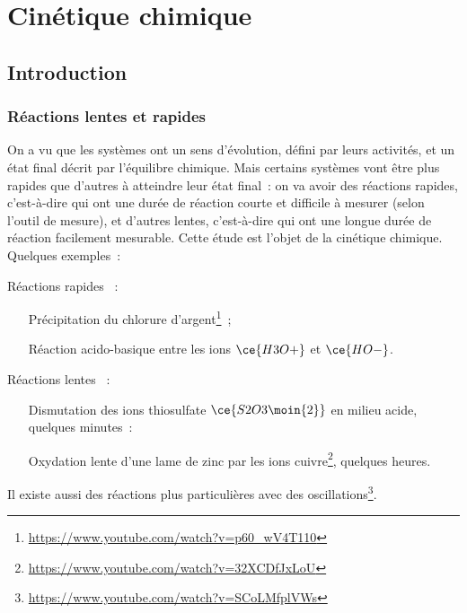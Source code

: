 \documentclass[../main/main.tex]{subfiles}
\begin{document}
\setcounter{chapter}{2}

\chapter{Cin\'etique chimique}

\section{Introduction}
\subsection{Réactions lentes et rapides}

On a vu que les systèmes ont un sens d'évolution, défini par leurs activités, et
un état final décrit par l'équilibre chimique. Mais certains systèmes vont être
plus rapides que d'autres à atteindre leur état final~: on va avoir des
réactions rapides, c'est-à-dire qui ont une durée de réaction courte et
difficile à mesurer (selon l'outil de mesure), et d'autres lentes, c'est-à-dire
qui ont une longue durée de réaction facilement mesurable. Cette étude est
l'objet de la cinétique chimique. Quelques exemples~:

\begin{bolditemize}
    \item[Réactions rapides]~:
        \begin{itemize}
            \item[] Précipitation du chlorure
                d'argent\footnote{\label{fn:vid1}\url{https://www.youtube.com/watch?v=p60\_wV4T110}}~;
            \item[] Réaction acido-basique entre les ions $\ce{H3O+}$ et
                $\ce{HO-}$.
        \end{itemize}
    \item[Réactions lentes]~:
        \begin{itemize}
            \item[] Dismutation des ions thiosulfate $\ce{S2O3\moin{2}}$ en
                milieu acide, quelques minutes~:
            \item[] Oxydation lente d'une lame de zinc par les ions
                cuivre\footnote{\url{https://www.youtube.com/watch?v=32XCDfJxLoU}},
                quelques heures.
        \end{itemize}
\end{bolditemize}

Il existe aussi des réactions plus particulières avec des
oscillations\footnote{\url{https://www.youtube.com/watch?v=SCoLMfplVWs}}.
\end{document}

